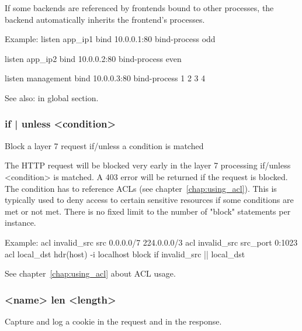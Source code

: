   If some backends are referenced by frontends bound to other processes, the
  backend automatically inherits the frontend's processes.

  \begin{example}{Example:}
        listen app_ip1
            bind 10.0.0.1:80
            bind-process odd

        listen app_ip2
            bind 10.0.0.2:80
            bind-process even

        listen management
            bind 10.0.0.3:80
            bind-process 1 2 3 4
  \end{example}


See also:  in global section.

\subsubsection[block]{ { if | unless } <condition>}
  Block a layer 7 request if/unless a condition is matched


  The HTTP request will be blocked very early in the layer 7 processing
  if/unless <condition> is matched. A 403 error will be returned if the request
  is blocked. The condition has to reference ACLs (see chapter~\ref{chap:using_acl}). This is
  typically used to deny access to certain sensitive resources if some
  conditions are met or not met. There is no fixed limit to the number of
  "block" statements per instance.

  \begin{example}{Example:}
        acl invalid_src  src          0.0.0.0/7 224.0.0.0/3
        acl invalid_src  src_port     0:1023
        acl local_dst    hdr(host) -i localhost
        block if invalid_src || local_dst
  \end{example}

  See chapter~\ref{chap:using_acl} about ACL usage.

\subsubsection[capture cookie]{ <name> len <length>}
  Capture and log a cookie in the request and in the response.

                                  
